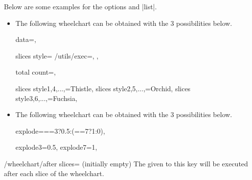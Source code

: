 \documentclass[a4paper,english,dvipsnames]{ltxdoc}
\begin{document}
Below are some examples for the options  and |{list}|.
\begin{itemize}
\item The following wheelchart can be obtained with the 3 possibilities below.
\begin{codeexample}[width=10cm]
\begin{tikzpicture}
\wheelchart[
  data{list}={
    An,example,where,some,of,the,
    keys,are,given,using,a,list
  },
  slices style{list}={
    Thistle,Orchid,Fuchsia
  },
  total count=12
]{}
\end{tikzpicture}
\end{codeexample}
\begin{codeexample}[code only,preamble={\usepackage{listofitems}}]
\readlist{}

\setsepchar{ }
\readlist{}

data={\WCdata[\WCcount]},

slices style={
  /utils/exec={},
  \WCcolors[\WCcolornumber]
},

total count=\WCdatalen,
\end{codeexample}
\begin{codeexample}
slices style{1,4,...,\WCdatalen}=Thistle,
slices style{2,5,...,\WCdatalen}=Orchid,
slices style{3,6,...,\WCdatalen}=Fuchsia,
\end{codeexample}
\item The following wheelchart can be obtained with the 3 possibilities below.
\begin{codeexample}[width=10cm]
\begin{tikzpicture}
\wheelchart[
  explode=\WCvarF,
  pie
]{\exampleforthismanual}
\end{tikzpicture}
\end{codeexample}
\begin{codeexample}
explode={\WCcount==3?0.5:(\WCcount==7?1:0)},
\end{codeexample}
\begin{codeexample}
explode{3}=0.5,
explode{7}=1,
\end{codeexample}
\end{itemize}
\begin{key}{/wheelchart/after slices= (initially \normalfont empty)}
The  given to this key will be executed after each slice of the wheelchart.
\end{key}
\end{document}
